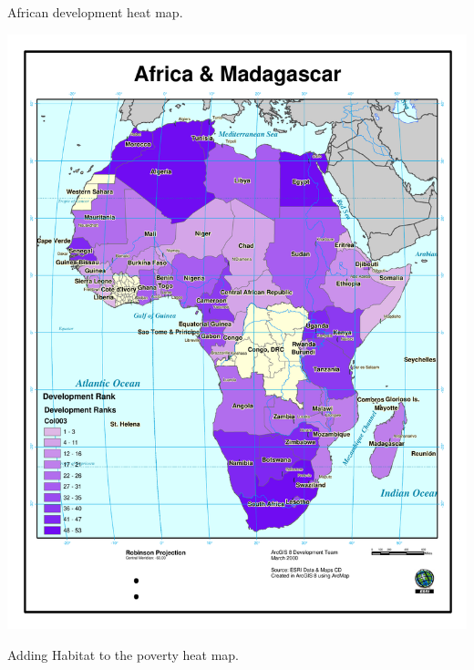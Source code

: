 \newpage

African development heat map.

\includegraphics[width=6in]{Images/GIS/PovertyFeatureMapV1Development.pdf}
\newpage

Adding Habitat to the poverty heat map.

